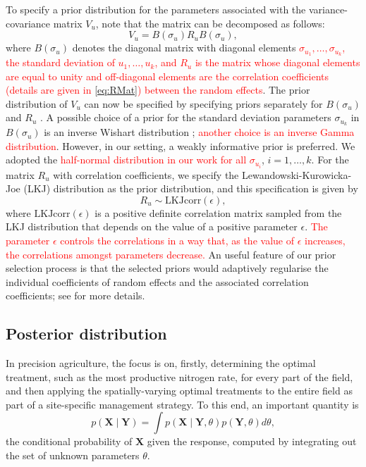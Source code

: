 \documentclass[a4paper]{article}   	%
\begin{document}
	To specify a prior distribution for the parameters associated with the variance-covariance matrix $V_u$, note that the matrix can be decomposed as follows:
	\begin{equation}\label{eq:varmat}
		V_u = B(\sigma_u)R_u B(\sigma_u),
	\end{equation}
	where $B(\sigma_u)$ denotes the diagonal matrix with diagonal elements \textcolor{red}{$\sigma_{u_1},\ldots,\sigma_{u_k}$, the standard deviation of $u_1,\ldots,u_k$, and $R_u$ is the matrix whose diagonal elements are equal to unity and off-diagonal elements are the correlation coefficients (details are given in \eqref{eq:RMat}) between the random effects}. The prior distribution of $V_u$ can now be specified by specifying priors separately for $B(\sigma_u)$ and $R_u$ \parencite{ McElreath2015Statistical}. A possible choice of a prior for the standard deviation parameters $\sigma_{u_k}$ in $B(\sigma_u)$ is an inverse Wishart distribution \parencite{Kass2006Default}; \textcolor{red}{another choice is an inverse Gamma distribution}. However, in our setting, a weakly informative prior is preferred. We adopted the \textcolor{red}{half-normal distribution in our work for all $\sigma_{u_i}$}, $i=1,\ldots,k$. For the matrix $R_u$ with correlation coefficients, we specify the Lewandowski-Kurowicka-Joe (LKJ) distribution \parencite{Lewandowski2009Generating} as the prior distribution, and this specification is given by
	\begin{equation}\label{eq:RPrior}
		R_u \sim \text{LKJcorr}(\epsilon),
	\end{equation}
	where $\text{LKJcorr}(\epsilon)$ is a positive definite correlation matrix sampled from the LKJ distribution that depends on the value of a positive parameter $\epsilon$. \textcolor{red}{The parameter $\epsilon$ controls the correlations in a way that, as the value of $\epsilon$ increases, the correlations amongst parameters decrease.} An useful feature of our prior selection process is that the selected priors would adaptively regularise the individual coefficients of random effects and the associated correlation coefficients; see \textcite{gelman2017Prior, gabry2019Visualization} for more details. 
	
	
	\subsection{Posterior distribution}
	
	In precision agriculture, the focus is on, firstly, determining the optimal treatment, such as the most productive nitrogen rate, for every part of the field, and then applying the spatially-varying optimal treatments to the entire field as part of a site-specific management strategy. To this end, an important quantity is 
	\begin{equation}
		p(\bm{X}\mid \bm{Y}) = \int p(\bm{X}\mid \bm{Y},\theta)p(\bm{Y},\theta)d\theta,
	\end{equation}
	the conditional probability of $\bm{X}$ given the response, computed by integrating out the set of unknown parameters $\theta$. 
	
\end{document}
